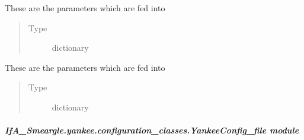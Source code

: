 \documentclass[letterpaper,10pt,english]{sphinxmanual}
\begin{document}
\begin{fulllineitems}
\begin{fulllineitems}
\label{\detokenize{python_docstrings/IfA_Smeargle.yankee.configuration_classes.OscarConfig_file:IfA_Smeargle.yankee.configuration_classes.OscarConfig_file.OscarConfig.histogram_config}}
These are the parameters which are fed into
\begin{quote}\begin{description}
\item[{Type}] \leavevmode
dictionary

\end{description}\end{quote}

\end{fulllineitems}


\begin{fulllineitems}
\label{\detokenize{python_docstrings/IfA_Smeargle.yankee.configuration_classes.OscarConfig_file:IfA_Smeargle.yankee.configuration_classes.OscarConfig_file.OscarConfig.heathist_config}}
These are the parameters which are fed into
\begin{quote}\begin{description}
\item[{Type}] \leavevmode
dictionary

\end{description}\end{quote}

\end{fulllineitems}


\end{fulllineitems}



\subparagraph{IfA\_Smeargle.yankee.configuration\_classes.YankeeConfig\_file module}
\label{\detokenize{python_docstrings/IfA_Smeargle.yankee.configuration_classes.YankeeConfig_file:module-IfA_Smeargle.yankee.configuration_classes.YankeeConfig_file}}\label{\detokenize{python_docstrings/IfA_Smeargle.yankee.configuration_classes.YankeeConfig_file:ifa-smeargle-yankee-configuration-classes-yankeeconfig-file-module}}\label{\detokenize{python_docstrings/IfA_Smeargle.yankee.configuration_classes.YankeeConfig_file::doc}}
\end{document}
